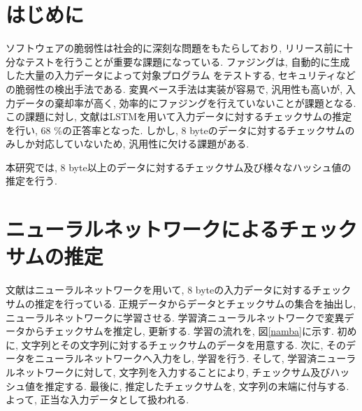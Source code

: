 \documentclass[twocolumn, a4paper]{ieicejsp}
\begin{document}
\maketitle
\section{はじめに}

ソフトウェアの脆弱性は社会的に深刻な問題をもたらしており,
リリース前に十分なテストを行うことが重要な課題になっている.
ファジングは, 自動的に生成した大量の入力データによって対象プログラム
をテストする, セキュリティなどの脆弱性の検出手法である.
変異ベース手法は実装が容易で, 汎用性も高いが,
入力データの棄却率が高く, 効率的にファジングを行えていないことが課題となる.
この課題に対し, 文献\cite{namba}はLSTMを用いて入力データに対するチェックサムの推定を行い, 68 \%の正答率となった.
しかし, 8 byteのデータに対するチェックサムのみしか対応していないため, 汎用性に欠ける課題がある.

本研究では, 8 byte以上のデータに対するチェックサム及び様々なハッシュ値の推定を行う.


\section{ニューラルネットワークによるチェックサムの推定}

文献\cite{namba}はニューラルネットワークを用いて, 8 byteの入力データに対するチェックサムの推定を行っている.
正規データからデータとチェックサムの集合を抽出し, ニューラルネットワークに学習させる.
学習済ニューラルネットワークで変異データからチェックサムを推定し, 更新する.
学習の流れを, 図\ref{namba}に示す.
初めに, 文字列とその文字列に対するチェックサムのデータを用意する.
次に, そのデータをニューラルネットワークへ入力をし, 学習を行う.
そして, 学習済ニューラルネットワークに対して, 文字列を入力することにより, チェックサム及びハッシュ値を推定する.
最後に, 推定したチェックサムを, 文字列の末端に付与する.
よって, 正当な入力データとして扱われる.
\end{document}
